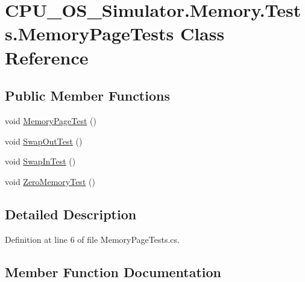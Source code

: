\hypertarget{class_c_p_u___o_s___simulator_1_1_memory_1_1_tests_1_1_memory_page_tests}{}\section{C\+P\+U\+\_\+\+O\+S\+\_\+\+Simulator.\+Memory.\+Tests.\+Memory\+Page\+Tests Class Reference}
\label{class_c_p_u___o_s___simulator_1_1_memory_1_1_tests_1_1_memory_page_tests}
\subsection*{Public Member Functions}
\begin{DoxyCompactItemize}
\item 
void \hyperlink{class_c_p_u___o_s___simulator_1_1_memory_1_1_tests_1_1_memory_page_tests_a5dd24d4a39172f2a347e7106c806fa89}{Memory\+Page\+Test} ()
\item 
void \hyperlink{class_c_p_u___o_s___simulator_1_1_memory_1_1_tests_1_1_memory_page_tests_ad05389a6c85964130902bd4f64e5d097}{Swap\+Out\+Test} ()
\item 
void \hyperlink{class_c_p_u___o_s___simulator_1_1_memory_1_1_tests_1_1_memory_page_tests_a67f2a05fc4c4c02991dd9d14348230cf}{Swap\+In\+Test} ()
\item 
void \hyperlink{class_c_p_u___o_s___simulator_1_1_memory_1_1_tests_1_1_memory_page_tests_aa7b9c0c2148fe416facbb7588d729566}{Zero\+Memory\+Test} ()
\end{DoxyCompactItemize}


\subsection{Detailed Description}


Definition at line 6 of file Memory\+Page\+Tests.\+cs.



\subsection{Member Function Documentation}
\hypertarget{class_c_p_u___o_s___simulator_1_1_memory_1_1_tests_1_1_memory_page_tests_a5dd24d4a39172f2a347e7106c806fa89}{}
